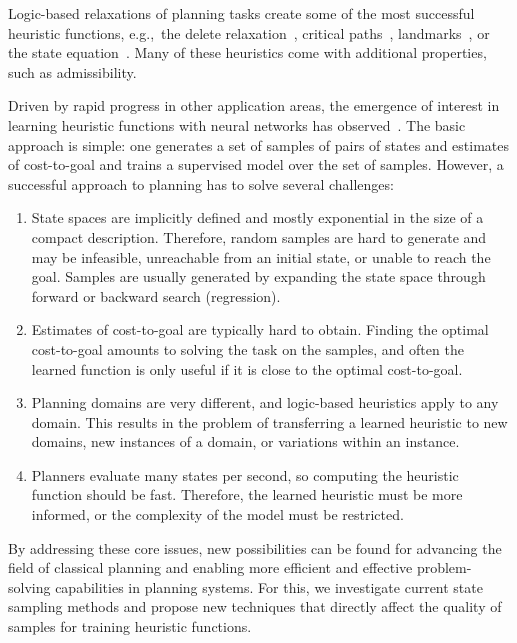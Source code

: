 Logic-based relaxations of planning tasks create some of the most successful heuristic functions, e.g.,~the delete relaxation~\cite{Hoffmann.Nebel/2001}, critical paths~\cite{haslum-geffner-aips2000}, landmarks~\cite{hoffmann-et-al-jair2004,Karpas.Domshlak/2009}, or the state equation~\cite{bonet-ijcai2013}. Many of these heuristics come with additional properties, such as admissibility.

Driven by rapid progress in other application areas, the emergence of interest in learning heuristic functions with neural networks has observed~\cite{samadi-et-al-aaai2008,Arfaee.etal/2011,Agostinelli.etal/2019,Yu.etal/2020,Shen.etal/2020,Ferber.etal/2020a,Toyer.etal/2020,Ferber.etal/2022,OToole/2022}. The basic approach is simple: one generates a set of samples of pairs of states and estimates of cost-to-goal and trains a supervised model over the set of samples. However, a successful approach to planning has to solve several challenges:

\begin{enumerate}[label=C\arabic*),left=0pt]
    \itemsep0pt
    \item State spaces are implicitly defined and mostly exponential in the size of a compact description. Therefore, random samples are hard to generate and may be infeasible, unreachable from an initial state, or unable to reach the goal. Samples are usually generated by expanding the state space through forward or backward search (regression).
    \item Estimates of cost-to-goal are typically hard to obtain. Finding the optimal cost-to-goal amounts to solving the task on the samples, and often the learned function is only useful if it is close to the optimal cost-to-goal.
    \item Planning domains are very different, and logic-based heuristics apply to any domain. This results in the problem of transferring a learned heuristic to new domains, new instances of a domain, or variations within an instance.
    \item Planners evaluate many states per second, so computing the heuristic function should be fast. Therefore, the learned heuristic must be more informed, or the complexity of the model must be restricted.
\end{enumerate}

By addressing these core issues, new possibilities can be found for advancing the field of classical planning and enabling more efficient and effective problem-solving capabilities in planning systems. For this, we investigate current state sampling methods and propose new techniques that directly affect the quality of samples for training heuristic functions.

